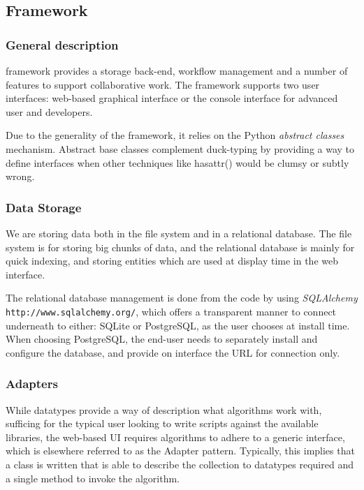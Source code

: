 
	\subsection{\TVB Framework}

	\subsubsection{General description}

\TVB framework provides a storage back-end, workflow management and a number of features to
support collaborative work. The framework supports two user interfaces: web-based graphical interface or the
console interface for advanced user and developers.

Due to the generality of the framework, it relies on the Python \emph{abstract classes} mechanism.
Abstract base classes complement duck-typing by providing a way to define
interfaces when other techniques like hasattr() would be clumsy or subtly wrong.

\subsubsection{Data Storage}

We are storing data both in the file system and in a relational database.
The file system is for storing big chunks of data, and the relational database is mainly for quick indexing, 
and storing entities which are used at display time in the web interface.

The relational database management is done from the code by using \emph{SQLAlchemy} \texttt{http://www.sqlalchemy.org/}, 
which offers a transparent manner to connect underneath to either: SQLite or PostgreSQL, as the user chooses at install time.
When choosing PostgreSQL, the end-user needs to separately install and configure the database, and provide on \TVB
interface the URL for connection only.


\subsubsection{Adapters}

While datatypes provide a way of description what algorithms work with, 
sufficing for the typical user looking to write scripts against the
available libraries, the web-based UI requires algorithms to adhere to 
a generic interface, which is elsewhere referred to as the Adapter pattern.
Typically, this implies that a class is written that is able to describe
the collection to datatypes required and a single method to invoke the
algorithm.

